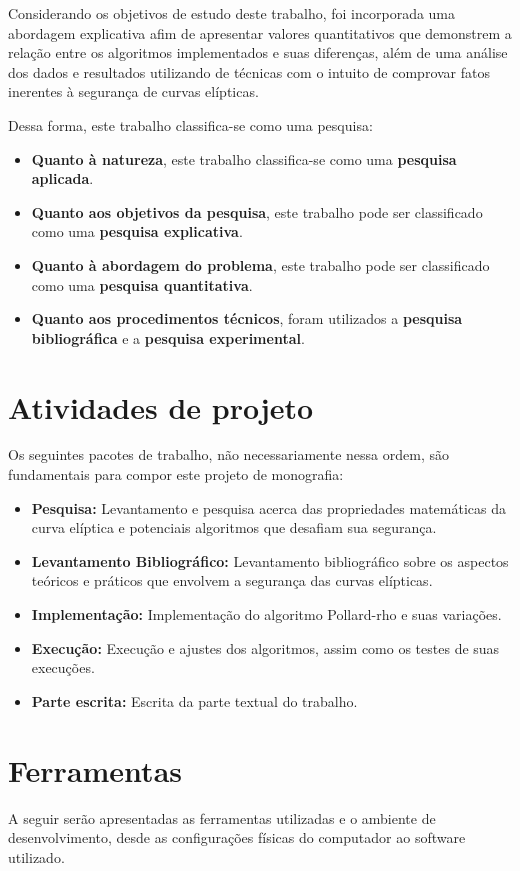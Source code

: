 Considerando os objetivos de estudo deste trabalho, foi incorporada uma abordagem explicativa afim de apresentar valores quantitativos que demonstrem a relação entre os algoritmos implementados e suas diferenças, além de uma análise dos dados e resultados utilizando de técnicas com o intuito de comprovar fatos inerentes à segurança de curvas elípticas.

Dessa forma, este trabalho classifica-se como uma pesquisa:
\begin{itemize}
\item \textbf{Quanto à natureza}, este trabalho classifica-se como uma \textbf{pesquisa aplicada}.
\item \textbf{Quanto aos objetivos da pesquisa}, este trabalho pode ser classificado como uma \textbf{pesquisa explicativa}.
\item \textbf{Quanto à abordagem do problema}, este trabalho pode ser classificado como uma \textbf{pesquisa quantitativa}.
\item \textbf{Quanto aos procedimentos técnicos}, foram utilizados a \textbf{pesquisa bibliográfica} e a \textbf{pesquisa experimental}.
\end{itemize}

%
%
\section{Atividades de projeto}
Os seguintes pacotes de trabalho, não necessariamente nessa ordem, são fundamentais para compor este projeto de monografia:
\begin{itemize}
\item \textbf{Pesquisa:} Levantamento e pesquisa acerca das propriedades matemáticas da curva elíptica e potenciais algoritmos que desafiam sua segurança.
\item \textbf{Levantamento Bibliográfico:} Levantamento bibliográfico sobre os aspectos teóricos e práticos que envolvem a segurança das curvas elípticas.
\item \textbf{Implementação:} Implementação do algoritmo Pollard-rho e suas variações.
\item \textbf{Execução:} Execução e ajustes dos algoritmos, assim como os testes de suas execuções.
\item \textbf{Parte escrita:} Escrita da parte textual do trabalho.
\end{itemize}

%
%
\section{Ferramentas}
A seguir serão apresentadas as ferramentas utilizadas e o ambiente de desenvolvimento, desde as configurações físicas do computador ao software utilizado.

